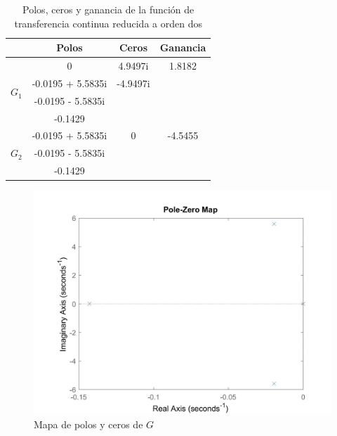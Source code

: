 \documentclass[journal]{IEEEtran}
\begin{document}
\begin{table}[!h]
\centering
\caption{Polos, ceros y ganancia de la función de transferencia continua reducida a orden dos}
\label{tab: pzg tfc}
\begin{tabular}{@{}lccc@{}}
\toprule
                  & Polos & Ceros             & Ganancia          \\ \midrule
\multirow{4}{*}{$G_1$} & 0 & 4.9497i & 1.8182 \\
                  & -0.0195 + 5.5835i &        -4.9497i           &                   \\
                  & -0.0195 - 5.5835i & &                   \\
                  &    -0.1429  &                   &                   \\ \midrule
\multirow{3}{*}{$G_2$} & -0.0195 + 5.5835i & 0 & -4.5455 \\
                  & -0.0195 - 5.5835i &           &                   \\
                  & -0.1429 & &                  
                  \\ \bottomrule
\end{tabular}
\end{table}


\begin{figure}[ht!]
\caption{Mapa de polos y ceros de $G$\label{fig:pzG}}
  \centering
\includegraphics[scale=0.18]{tf/pzmap_G.jpg}
\end{figure}
\end{document}
